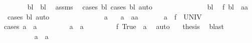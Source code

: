 \begin{isabellebody}
\ \ \ \ \ \isamarkupfalse%
\ {\isachardoublequoteopen}bl{}\ {\isacharequal}{\kern0pt}\ bl{}{\isachardoublequoteclose}\ \isamarkupfalse%
\ assms\ \isamarkupfalse%
\ {\isacharparenleft}{\kern0pt}cases\ bl{}{\isacharcomma}{\kern0pt}\ cases\ bl{}{\isacharparenright}{\kern0pt}\ auto\isanewline
\ \ \ \ \isacommand{{\isacharbraceright}{\kern0pt}}\isamarkupfalse%
\isanewline
\ \ \ \ \isamarkupfalse%
\isanewline
\ \ \ \ \isacommand{{\isacharbraceleft}{\kern0pt}}\isamarkupfalse%
\isamarkupfalse%
\ bl\ \isamarkupfalse%
\ {\isachardoublequoteopen}{\isacharquery}{\kern0pt}f\ bl\ {\isasymin}\ {\isacharbraceleft}{\kern0pt}a{}{\isacharcomma}{\kern0pt}a{}{\isacharbraceright}{\kern0pt}{\isachardoublequoteclose}\ \isamarkupfalse%
\ {\isacharparenleft}{\kern0pt}cases\ bl{\isacharparenright}{\kern0pt}\ auto\isanewline
\ \ \ \ \isacommand{{\isacharbraceright}{\kern0pt}}\isamarkupfalse%
\isanewline
\ \ \ \ \isamarkupfalse%
\isanewline
\ \ \ \ \isacommand{{\isacharbraceleft}{\kern0pt}}\isamarkupfalse%
\isamarkupfalse%
\ a\ \isamarkupfalse%
\ {\isacharasterisk}{\kern0pt}{\isacharcolon}{\kern0pt}\ {\isachardoublequoteopen}a\ {\isasymin}\ {\isacharbraceleft}{\kern0pt}a{}{\isacharcomma}{\kern0pt}a{}{\isacharbraceright}{\kern0pt}{\isachardoublequoteclose}\isanewline
\ \ \ \ \ \isamarkupfalse%
\ {\isachardoublequoteopen}a\ {\isasymin}\ {\isacharquery}{\kern0pt}f\ {\isacharbackquote}{\kern0pt}\ UNIV{\isachardoublequoteclose}\isanewline
\ \ \ \ \ \isamarkupfalse%
{\isacharparenleft}{\kern0pt}cases\ {\isachardoublequoteopen}a\ {\isacharequal}{\kern0pt}\ a{}{\isachardoublequoteclose}{\isacharparenright}{\kern0pt}\isanewline
\ \ \ \ \ \ \ \isamarkupfalse%
\ {\isachardoublequoteopen}a\ {\isacharequal}{\kern0pt}\ a{}{\isachardoublequoteclose}\isanewline
\ \ \ \ \ \ \ \isamarkupfalse%
\ {\isachardoublequoteopen}{\isacharquery}{\kern0pt}f\ True\ {\isacharequal}{\kern0pt}\ a{\isachardoublequoteclose}\ \isamarkupfalse%
\ auto\ \ \isamarkupfalse%
\ {\isacharquery}{\kern0pt}thesis\ \isamarkupfalse%
\ blast\isanewline
\ \ \ \ \ \isamarkupfalse%
\isanewline
\ \ \ \ \ \ \ \isamarkupfalse%
\ {\isachardoublequoteopen}a\ {\isasymnoteq}\ a{}{\isachardoublequoteclose}\ \isamarkupfalse%

\end{isabellebody}

